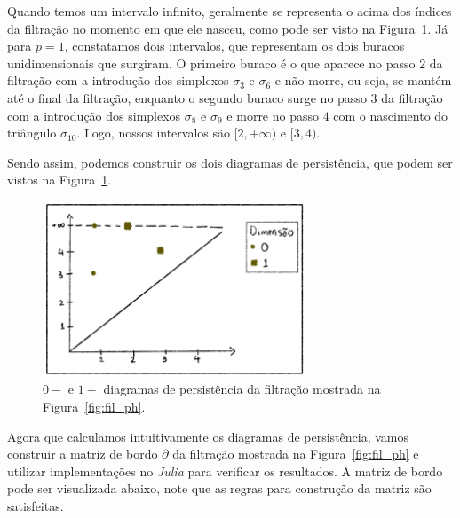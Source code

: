 Quando temos um intervalo infinito, geralmente se representa o acima dos
índices da filtração no momento em que ele nasceu, como pode ser visto na
Figura~\ref{fig:persdiag_ex}. Já para $p=1$, constatamos dois intervalos,
que representam os dois buracos unidimensionais que surgiram. O primeiro buraco
é o que aparece no passo $2$ da filtração com a introdução dos simplexos
$\sigma_3$ e $\sigma_6$ e não morre, ou seja, se mantém até o final da filtração,
enquanto o segundo buraco surge no passo $3$ da filtração com a introdução
dos simplexos $\sigma_8$ e $\sigma_9$ e morre no passo $4$ com o nascimento
do triângulo $\sigma_{10}$. Logo, nossos intervalos são $[2, +\infty)$ e $[3,4)$.

Sendo assim, podemos construir os dois diagramas de persistência, que podem
ser vistos na Figura~\ref{fig:persdiag_ex}.
\begin{figure}[!htpb]
  \centering
  \includegraphics[width=0.7\textwidth]{images/persdiag_ex.png}
  \caption{$0-$ e $1-$ diagramas de persistência da filtração mostrada na
  Figura~\ref{fig:fil_ph}.}
  \label{fig:persdiag_ex}
  \fautor
\end{figure}

Agora que calculamos intuitivamente os diagramas de persistência, vamos
construir a matriz de bordo $\partial$ da filtração mostrada na
Figura~\ref{fig:fil_ph} e utilizar implementações no \textit{Julia} para verificar
os resultados. A matriz de bordo pode ser visualizada abaixo, note que as regras
para construção da matriz são satisfeitas.

